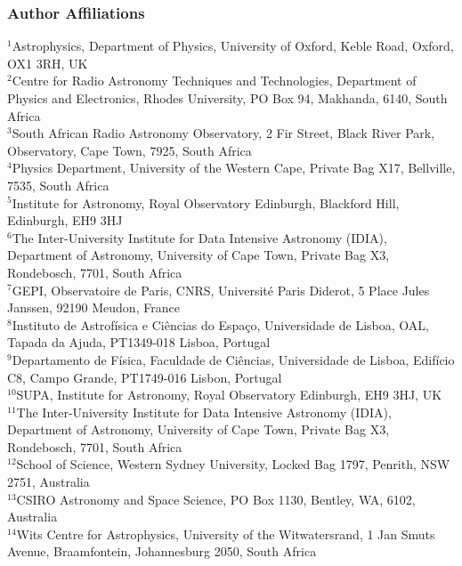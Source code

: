 \documentclass[usenatbib,usedcolumn]{mnras}
\begin{document}
\subsubsection*{Author Affiliations}
\footnotesize
$^{1}$Astrophysics, Department of Physics, University of Oxford, Keble Road, Oxford, OX1 3RH, UK\\ 
$^{2}$Centre for Radio Astronomy Techniques and Technologies, Department of Physics and Electronics, Rhodes University, PO Box 94, Makhanda, 6140, South Africa\\
$^{3}$South African Radio Astronomy Observatory, 2 Fir Street, Black River Park, Observatory, Cape Town, 7925, South Africa\\
$^{4}$Physics Department, University of the Western Cape, Private Bag X17, Bellville, 7535, South Africa\\
$^{5}$Institute for Astronomy, Royal Observatory Edinburgh, Blackford Hill, Edinburgh, EH9 3HJ\\
$^{6}$The Inter-University Institute for Data Intensive Astronomy (IDIA), Department of Astronomy, University of Cape Town, Private Bag X3, Rondebosch, 7701, South Africa\\
$^{7}$GEPI, Observatoire de Paris, CNRS, Université Paris Diderot, 5 Place Jules Janssen, 92190 Meudon, France\\
$^{8}$Instituto de Astrof\'{i}sica e Ci\^{e}ncias do Espa\c co, Universidade de Lisboa, OAL, Tapada da Ajuda, PT1349-018 Lisboa, Portugal\\
$^{9}$Departamento de F\'{i}sica, Faculdade de Ci\^{e}ncias, Universidade de Lisboa, Edif\'{i}cio C8, Campo Grande, PT1749-016 Lisbon, Portugal\\
$^{10}$SUPA, Institute for Astronomy, Royal Observatory Edinburgh, EH9 3HJ, UK\\
$^{11}$The Inter-University Institute for Data Intensive Astronomy (IDIA), Department of Astronomy, University of Cape Town, Private Bag X3, Rondebosch, 7701, South Africa\\
$^{12}$School of Science, Western Sydney University, Locked Bag 1797, Penrith, NSW 2751, Australia\\
$^{13}$CSIRO Astronomy and Space Science, PO Box 1130, Bentley, WA, 6102, Australia\\
$^{14}$Wits Centre for Astrophysics, University of the Witwatersrand, 1 Jan Smuts Avenue, Braamfontein, Johannesburg 2050, South Africa\\
\end{document}
